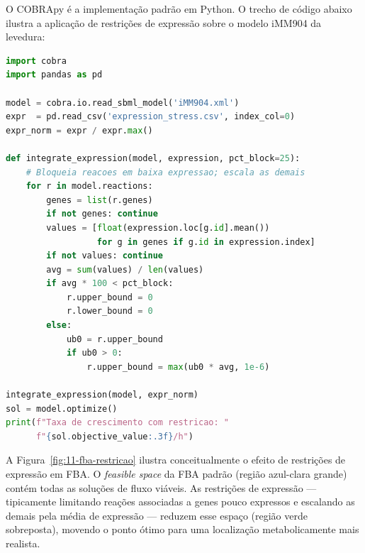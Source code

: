 O COBRApy é a implementação padrão em Python. O trecho de código abaixo
ilustra a aplicação de restrições de expressão sobre o modelo iMM904 da
levedura:

\begin{lstlisting}[language=Python, caption=FBA integrado com transcriptomica]
import cobra
import pandas as pd

model = cobra.io.read_sbml_model('iMM904.xml')
expr  = pd.read_csv('expression_stress.csv', index_col=0)
expr_norm = expr / expr.max()

def integrate_expression(model, expression, pct_block=25):
    # Bloqueia reacoes em baixa expressao; escala as demais
    for r in model.reactions:
        genes = list(r.genes)
        if not genes: continue
        values = [float(expression.loc[g.id].mean())
                  for g in genes if g.id in expression.index]
        if not values: continue
        avg = sum(values) / len(values)
        if avg * 100 < pct_block:
            r.upper_bound = 0
            r.lower_bound = 0
        else:
            ub0 = r.upper_bound
            if ub0 > 0:
                r.upper_bound = max(ub0 * avg, 1e-6)

integrate_expression(model, expr_norm)
sol = model.optimize()
print(f"Taxa de crescimento com restricao: "
      f"{sol.objective_value:.3f}/h")
\end{lstlisting}

A Figura~\ref{fig:11-fba-restricao} ilustra conceitualmente o efeito de
restrições de expressão em FBA. O \emph{feasible space} da FBA padrão
(região azul-clara grande) contém todas as soluções de fluxo
viáveis. As restrições de expressão --- tipicamente limitando reações
associadas a genes pouco expressos e escalando as demais pela média de
expressão --- reduzem esse espaço (região verde sobreposta), movendo o
ponto ótimo para uma localização metabolicamente mais realista.

